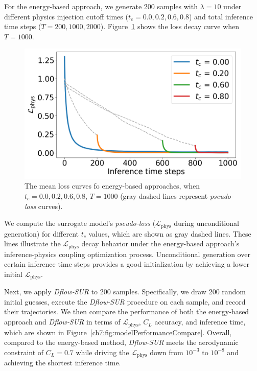 For the energy-based approach, we generate $200$ samples with $\lambda = 10$ under different physics injection cutoff times ($t_c = 0.0, 0.2, 0.6, 0.8$) and total inference time steps ($T = 200, 1000, 2000$). Figure~\ref{ch7:fig:mean_loss_curve_1k} shows the loss decay curve when $T=1000$. 
\begin{figure}[htbp]
    \centering
    \includegraphics[width=0.65\linewidth]{chapter7/fig/mean_loss_curves_all_T_1000.png}
    \caption{The mean loss curves fo energy-based approaches, when $t_c = 0.0, 0.2, 0.6, 0.8$, $T=1000$ (gray dashed lines represent \textit{pseudo‐loss} curves).}
    \label{ch7:fig:mean_loss_curve_1k}
\end{figure}
We compute the surrogate model’s \textit{pseudo‐loss} ($\mathcal{L}_{\mathrm{phys}}$ during unconditional generation) for different $t_c$ values, which are shown as gray dashed lines. These lines illustrate the $\mathcal{L}_{\mathrm{phys}}$ decay behavior under the energy-based approach's inference-physics coupling optimization process. Unconditional generation over certain inference time steps provides a good initialization by achieving a lower initial $\mathcal{L}_{\mathrm{phys}}$.

Next, we apply \textit{Dflow‐SUR} to 200 samples. Specifically, we draw 200 random initial guesses, execute the \textit{Dflow‐SUR} procedure on each sample, and record their trajectories. We then compare the performance of both the energy‐based approach and \textit{Dflow‐SUR} in terms of $\mathcal{L}_{\mathrm{phys}}$, $C_{L}$ accuracy, and inference time, which are shown in Figure~\ref{ch7:fig:modelPerformanceCompare}. Overall, compared to the energy-based method, \textit{Dflow-SUR} meets the aerodynamic constraint of $C_L = 0.7$ while driving the $\mathcal{L}_{\mathrm{phys}}$ down from $10^{-3}$ to $10^{-8}$ and achieving the shortest inference time. 

